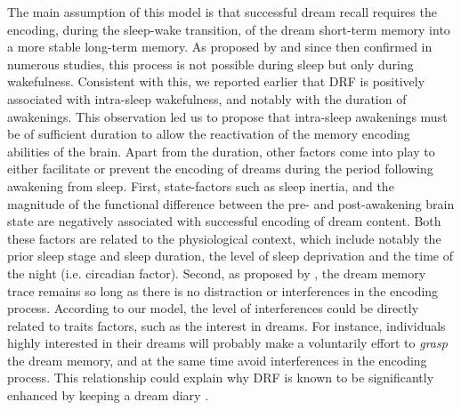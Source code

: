 The main assumption of this model is that successful dream recall requires the encoding, during the sleep-wake transition, of the dream short-term memory into a more stable long-term memory. As proposed by \citet{koulack_dream_1976} and since then confirmed in numerous studies, this process is not possible during sleep but only during wakefulness. Consistent with this, we reported earlier that DRF is positively associated with intra-sleep wakefulness, and notably with the duration of awakenings. This observation led us to propose that intra-sleep awakenings must be of sufficient duration to allow the reactivation of the memory encoding abilities of the brain. Apart from the duration, other factors come into play to either facilitate or prevent the encoding of dreams during the period following awakening from sleep. First, state-factors such as sleep inertia, and the magnitude of the functional difference between the pre- and post-awakening brain state \citep{koukkou_dreaming:_1983} are negatively associated with successful encoding of dream content. Both these factors are related to the physiological context, which include notably the prior sleep stage and sleep duration, the level of sleep deprivation and the time of the night (i.e. circadian factor). Second, as proposed by \citet{cohen_dream_1973}, the dream memory trace remains so long as there is no distraction or interferences in the encoding process. According to our model, the level of interferences could be directly related to traits factors, such as the interest in dreams. For instance, individuals highly interested in their dreams will probably make a voluntarily effort to \emph{grasp} the dream memory, and at the same time avoid interferences in the encoding process. This relationship could explain why DRF is known to be significantly enhanced by keeping a dream diary \citep{schredl_questionnaires_2002}.


